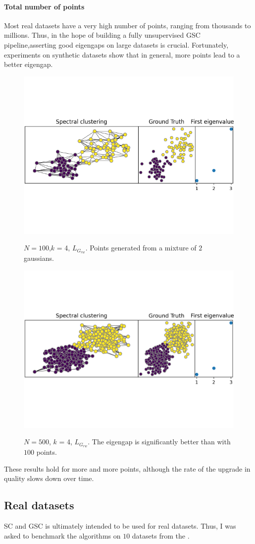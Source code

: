 \documentclass[a4paper,12pt]{article}
\theoremstyle{definition}
\theoremstyle{plain}
\begin{document}
\paragraph{Total number of points}
Most real datasets have a very high number of points, ranging from thousands to millions. Thus, in the hope of building a fully unsupervised GSC pipeline,asserting good eigengaps on large datasets is crucial.
Fortunately, experiments on synthetic datasets show that in general, more points lead to a better eigengap.
\begin{figure}[H]
	\centering
	\includegraphics[width=0.7\linewidth]{figures/circ_100_sym}
	\label{fig:circ_100_sym}
	\caption{$N=100$,$k$ = 4, $L_{G_{rw}}$. Points generated from a mixture of $2$ gaussians.}
\end{figure}
\begin{figure}[H]
	\centering
	\includegraphics[width=0.7\linewidth]{figures/circ_500_sym}
	\label{fig:circ_500_sym}
	\caption{$N=500$, $k$ = 4, $L_{G_{rw}}$. The eigengap is significantly better than with $100$ points. }
\end{figure}
These results hold for more and more points, although the rate of the upgrade in quality slows down over time.
\subsection{Real datasets}
SC and GSC is ultimately intended to be used for real datasets. Thus, I was asked to benchmark the algorithms on $10$ datasets from the \cite[UCI ML repository]{UCI} .
\end{document}
